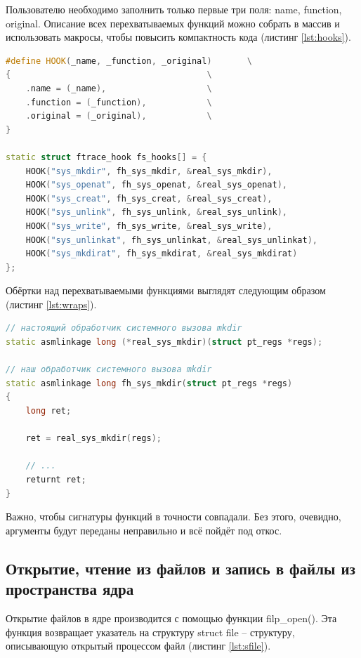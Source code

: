 \documentclass[a4paper,14pt]{article}
\begin{document}
Пользователю необходимо заполнить только первые три поля: name, function, original. Описание всех перехватываемых функций можно собрать в массив и использовать макросы, чтобы повысить компактность кода (листинг \ref{lst:hooks}).

\begin{lstlisting}[language=C++,label={lst:hooks}, caption=\text{Описание перехватываемых функций.}]
#define HOOK(_name, _function, _original)       \
{                                       \
	.name = (_name),                    \
	.function = (_function),            \
	.original = (_original),            \
}

static struct ftrace_hook fs_hooks[] = {
	HOOK("sys_mkdir", fh_sys_mkdir, &real_sys_mkdir),
	HOOK("sys_openat", fh_sys_openat, &real_sys_openat),
	HOOK("sys_creat", fh_sys_creat, &real_sys_creat),
	HOOK("sys_unlink", fh_sys_unlink, &real_sys_unlink),
	HOOK("sys_write", fh_sys_write, &real_sys_write),
	HOOK("sys_unlinkat", fh_sys_unlinkat, &real_sys_unlinkat),
	HOOK("sys_mkdirat", fh_sys_mkdirat, &real_sys_mkdirat)
};	
\end{lstlisting}

Обёртки над перехватываемыми функциями выглядят следующим образом (листинг \ref{lst:wraps}).

\begin{lstlisting}[language=C++,label={lst:wraps}, caption=\text{Ообёртка над перехватываемой функцией (на примере mkdir).}]
// настоящий обработчик системного вызова mkdir
static asmlinkage long (*real_sys_mkdir)(struct pt_regs *regs);

// наш обработчик системного вызова mkdir
static asmlinkage long fh_sys_mkdir(struct pt_regs *regs)
{
	long ret;

	ret = real_sys_mkdir(regs);

	// ...
	returnt ret;
}
\end{lstlisting}

Важно, чтобы сигнатуры функций в точности совпадали. Без этого, очевидно, аргументы будут переданы неправильно и всё пойдёт под откос.

\subsection{Открытие, чтение из файлов и запись в файлы из пространства ядра}

Открытие файлов в ядре производится с помощью функции filp\_open(). Эта функция возвращает указатель на структуру struct file -- структуру, описывающую открытый процессом файл (листинг \ref{lst:sfile}).
\end{document}
